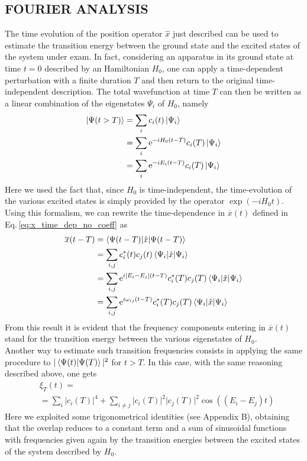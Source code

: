 \subsection{FOURIER ANALYSIS}
\label{sec:intro_fourier}
The time evolution of the position operator $\hat{x}$ just described can be used to estimate the transition energy between the ground state and the excited states of the system under exam. In fact, considering an apparatus in its ground state at time $t=0$ described by an Hamiltonian $H_0$, one can apply a time-dependent perturbation with a finite duration $T$ and then return to the original time-independent description. The total wavefunction at time $T$ can then be written as a linear combination of the eigenstates $\Psi_i$ of $H_0$, namely
\begin{align*}
    \ket{\Psi(t>T)} &= \sum_i c_i(t) \ket{\Psi_i}  \\
    &= \sum_i \text{e}^{-iH_0 (t-T)}  c_i(T) \ket{\Psi_i} \\
    &= \sum_i \text{e}^{-i E_i (t-T)} c_i(T) \ket{\Psi_i}
\end{align*}
Here we used the fact that, since $H_0$ is time-independent, the time-evolution of the various excited states is simply provided by the operator $\exp ( -iH_0t)$. Using this formalism, we can rewrite the time-dependence in $\overline{x}(t)$ defined in Eq.\,\ref{eq:x_time_dep_no_coeff} as
\begin{align}
    \overline{x}(t-T) &= \bracketOP{\Psi(t-T)}{\Psi(t-T)}{\hat{x}} \nonumber \\
    &= \sum_{i,j} c_i^*(t) c_j(t) \bracketOP{\Psi_i}{\Psi_i}{\hat{x}} \nonumber \\
    &= \sum_{i,j} \e^{i [E_i - E_j] (t-T)} c_i^*(T) c_j(T)  \bracketOP{\Psi_i}{\Psi_i}{\hat{x}} \nonumber \\
    &= \sum_{i,j} \e^{i \omega_{ij} (t-T)} c_i^*(T) c_j(T) \bracketOP{\Psi_i}{\Psi_i}{\hat{x}}
    \label{eq:transition_energies}
\end{align}
From this result it is evident that the frequency components entering in $\overline{x}(t)$ stand for the transition energy between the various eigenstates of $H_0$.  \\

Another way to estimate such transition frequencies consists in applying the same procedure to $\vert \braket{\Psi(t)}{\Psi(T)} \vert^2$ for $t>T$. In this case, with the same reasoning described above, one gets
\begin{align*}
    & \xi_T(t)=  \\
    &= \sum_i \vert c_i(T) \vert^4 + \sum_{i\neq j} \vert c_i(T) \vert^2 \vert c_j(T) \vert^2 \cos((E_i - E_j)t)
\end{align*}
Here we exploited some trigonometrical identities (see Appendix B), obtaining that the overlap reduces to a constant term and a sum of sinusoidal functions with frequencies given again by the transition energies between the excited states of the system described by $H_0$. 